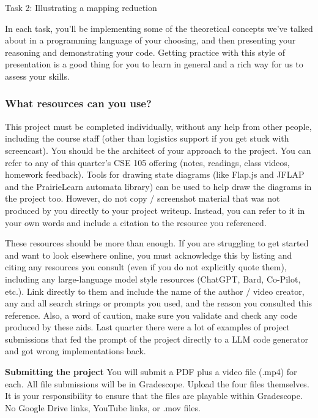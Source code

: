 \documentclass[12pt, oneside]{article}
\begin{document}
Task 2: Illustrating a mapping reduction

In each task, you'll be implementing some of the theoretical concepts we've talked about in a programming language of your choosing, and then presenting your reasoning and demonstrating your code. Getting practice with this 
style of presentation is a good thing  for you to learn in general and a rich 
way for us to assess your skills. 

\vspace{-20pt}

\subsubsection*{What resources can you use?} This project must be completed individually, 
without any help from other people, including the course staff (other than logistics support if 
you get stuck with screencast). You should be the architect of your approach to the project.
You can refer to any of this quarter's CSE 105 offering (notes, readings, class videos, homework feedback). 
Tools for drawing state diagrams (like Flap.js and JFLAP and the PrairieLearn automata library) can be used to help draw the diagrams 
in the project too. However, do not copy / screenshot material that was not produced by you directly to your project writeup. Instead, you can refer to it in your own words and include a citation to the resource you referenced.

These resources should be more than enough.
If you are struggling to get started and want to look elsewhere online, 
you must acknowledge this by listing and citing any resources you consult 
(even if you do not explicitly quote them), including any large-language model style resources (ChatGPT, Bard, Co-Pilot, etc.). 
Link directly to them and include the name of the author / video creator, 
any and all search strings or prompts you used, and the reason you consulted this reference.  Also, a word of caution, make sure you validate and check 
any code produced by these aids. Last quarter there were a lot of examples
of project submissions that fed the prompt of the project 
directly to a LLM code  generator and got wrong implementations back.

{\bf Submitting the project} You will submit a PDF plus a video file (.mp4) for each. All file submissions will be in Gradescope. Upload the four files themselves. It is your responsibility to ensure that the files are playable within Gradescope. No Google Drive links, YouTube links, or .mov files.
\end{document}
